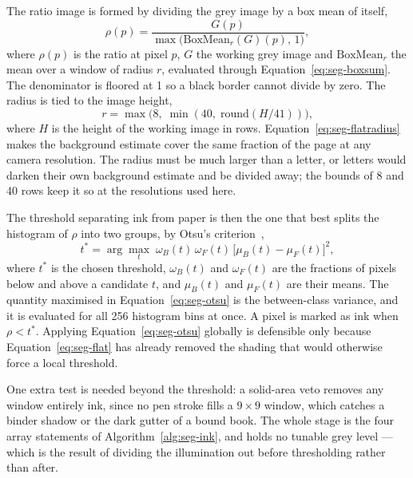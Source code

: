The ratio image is formed by dividing the grey image by a box mean of itself,
\begin{equation}
\rho(p)=\frac{G(p)}{\max\bigl(\mathrm{BoxMean}_r(G)(p),\,1\bigr)},
\label{eq:seg-flat}
\end{equation}
where $\rho(p)$ is the ratio at pixel $p$, $G$ the working grey image and $\mathrm{BoxMean}_r$ the mean over a window of radius $r$, evaluated through Equation~\ref{eq:seg-boxsum}. The denominator is floored at 1 so a black border cannot divide by zero. The radius is tied to the image height,
\begin{equation}
r=\max\bigl(8,\;\min(40,\;\mathrm{round}(H/41))\bigr),
\label{eq:seg-flatradius}
\end{equation}
where $H$ is the height of the working image in rows. Equation~\ref{eq:seg-flatradius} makes the background estimate cover the same fraction of the page at any camera resolution. The radius must be much larger than a letter, or letters would darken their own background estimate and be divided away; the bounds of 8 and 40 rows keep it so at the resolutions used here.

The threshold separating ink from paper is then the one that best splits the histogram of $\rho$ into two groups, by Otsu's criterion~\cite[p.~63]{otsu1979},
\begin{equation}
t^*=\arg\max_t\;\omega_B(t)\,\omega_F(t)\,\bigl[\mu_B(t)-\mu_F(t)\bigr]^2 ,
\label{eq:seg-otsu}
\end{equation}
where $t^*$ is the chosen threshold, $\omega_B(t)$ and $\omega_F(t)$ are the fractions of pixels below and above a candidate $t$, and $\mu_B(t)$ and $\mu_F(t)$ are their means. The quantity maximised in Equation~\ref{eq:seg-otsu} is the between-class variance, and it is evaluated for all 256 histogram bins at once. A pixel is marked as ink when $\rho<t^*$. Applying Equation~\ref{eq:seg-otsu} globally is defensible only because Equation~\ref{eq:seg-flat} has already removed the shading that would otherwise force a local threshold.

One extra test is needed beyond the threshold: a solid-area veto removes any window entirely ink, since no pen stroke fills a $9\times9$ window, which catches a binder shadow or the dark gutter of a bound book. The whole stage is the four array statements of Algorithm~\ref{alg:seg-ink}, and holds no tunable grey level --- which is the result of dividing the illumination out before thresholding rather than after.

